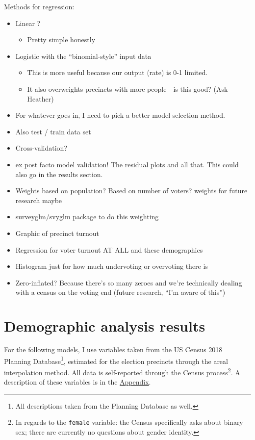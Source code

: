 \documentclass[12pt,twoside]{reedthesis}
\providecommand{\tightlist}{%
  \setlength{\itemsep}{0pt}\setlength{\parskip}{0pt}}
\begin{document}
Methods for regression:
\begin{itemize}
\tightlist
\item
  Linear ?
  \begin{itemize}
  \tightlist
  \item
    Pretty simple honestly
  \end{itemize}
\item
  Logistic with the ``binomial-style'' input data
  \begin{itemize}
  \tightlist
  \item
    This is more useful because our output (rate) is 0-1 limited.
  \item
    It also overweights precincts with more people - is this good? (Ask Heather)
  \end{itemize}
\item
  For whatever goes in, I need to pick a better model selection method.
\item
  Also test / train data set
\item
  Cross-validation?
\item
  ex post facto model validation! The residual plots and all that. This could also go in the results section.
\item
  Weights based on population? Based on number of voters? weights for future research maybe
\item
  surveyglm/svyglm package to do this weighting
\item
  Graphic of precinct turnout
\item
  Regression for voter turnout AT ALL and these demographics
\item
  Histogram just for how much undervoting or overvoting there is
\item
  Zero-inflated? Because there's so many zeroes and we're technically dealing with a census on the voting end (future research, ``I'm aware of this'')
\end{itemize}
\hypertarget{demo-results}{%
\chapter{Demographic analysis results}\label{demo-results}}

For the following models, I use variables taken from the US Census 2018 Planning Database\footnote{All descriptions taken from the Planning Database as well.}, estimated for the election precincts through the areal interpolation method. All data is self-reported through the Census process\footnote{In regards to the \texttt{female} variable: the Census specifically asks about binary sex; there are currently no questions about gender identity.}. A description of these variables is in the \protect\hyperlink{appendix}{Appendix}.
\end{document}
